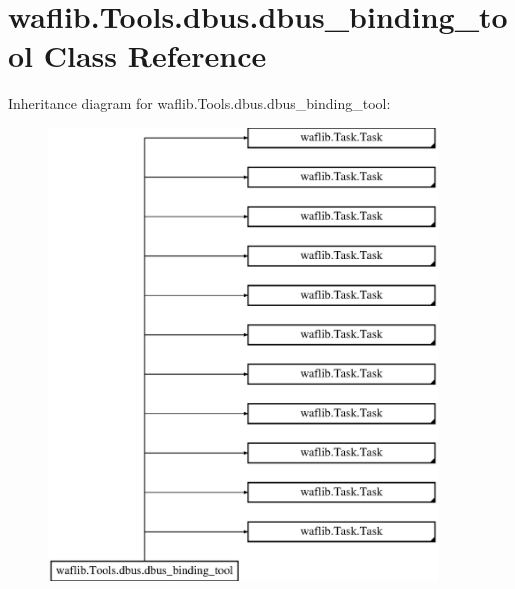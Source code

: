 \hypertarget{classwaflib_1_1_tools_1_1dbus_1_1dbus__binding__tool}{}\section{waflib.\+Tools.\+dbus.\+dbus\+\_\+binding\+\_\+tool Class Reference}
\label{classwaflib_1_1_tools_1_1dbus_1_1dbus__binding__tool}
Inheritance diagram for waflib.\+Tools.\+dbus.\+dbus\+\_\+binding\+\_\+tool\+:\begin{figure}[H]
\begin{center}
\leavevmode
\includegraphics[height=12.000000cm]{classwaflib_1_1_tools_1_1dbus_1_1dbus__binding__tool}
\end{center}
\end{figure}
